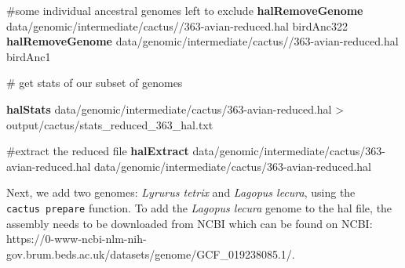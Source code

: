 \documentclass[
  letterpaper,
  DIV=11,
  numbers=noendperiod]{scrreprt}
\newenvironment{Shaded}{}{}
\newcommand{\CommentTok}[1]{\textcolor[rgb]{0.42,0.45,0.49}{#1}}
\newcommand{\ExtensionTok}[1]{\textcolor[rgb]{0.84,0.23,0.29}{\textbf{#1}}}
\newcommand{\NormalTok}[1]{\textcolor[rgb]{0.14,0.16,0.18}{#1}}
\newcommand{\OperatorTok}[1]{\textcolor[rgb]{0.14,0.16,0.18}{#1}}
\begin{document}
\begin{Shaded}
\begin{Highlighting}[]
\CommentTok{\#some individual ancestral genomes left to exclude}
\ExtensionTok{halRemoveGenome}\NormalTok{ data/genomic/intermediate/cactus//363{-}avian{-}reduced.hal birdAnc322}
\ExtensionTok{halRemoveGenome}\NormalTok{ data/genomic/intermediate/cactus//363{-}avian{-}reduced.hal birdAnc1}

\CommentTok{\# get stats of our subset of genomes}

\ExtensionTok{halStats}\NormalTok{ data/genomic/intermediate/cactus/363{-}avian{-}reduced.hal }\OperatorTok{\textgreater{}}\NormalTok{ output/cactus/stats\_reduced\_363\_hal.txt}

\CommentTok{\#extract the reduced file }
\ExtensionTok{halExtract}\NormalTok{ data/genomic/intermediate/cactus/363{-}avian{-}reduced.hal data/genomic/intermediate/cactus/363{-}avian{-}reduced.hal }
\end{Highlighting}
\end{Shaded}

Next, we add two genomes: \emph{Lyrurus tetrix} and \emph{Lagopus
lecura}, using the \texttt{cactus\ prepare} function. To add the
\emph{Lagopus lecura} genome to the hal file, the assembly needs to be
downloaded from NCBI which can be found on NCBI:
https://0-www-ncbi-nlm-nih-gov.brum.beds.ac.uk/datasets/genome/GCF\_019238085.1/.
\end{document}
